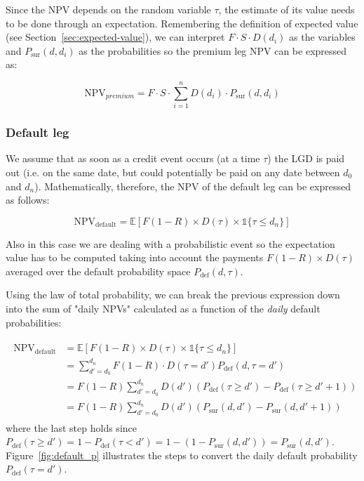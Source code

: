 Since the NPV depends on the random variable $\tau$, the estimate of its value needs to be done through an expectation.
Remembering the definition of expected value (see Section~\ref{sec:expected-value}), we can interpret 
\(F\cdot S\cdot D(d_i)\) as the variables and $P_{\textrm{sur}}(d, d_i)$ as the probabilities so the premium leg NPV can be expressed as:

\begin{equation}
	\textrm{NPV}_{premium} = F\cdot S \cdot \sum_{i=1}^{n} D(d_i) \cdot P_{\textrm{sur}}(d, d_i)
\end{equation}

\subsubsection{Default leg}\label{default-leg}

We assume that as soon as a credit event occurs (at a time $\tau$) the LGD is paid out (i.e. on the same date, but could potentially be paid on any date between \(d_0\) and \(d_n\)). Mathematically, therefore, the NPV of the default leg can be expressed as follows:

\begin{equation}
\mathrm{NPV_{default}} =\mathbb{E}[F(1-R) \times D(\tau) \times \mathbb{1} \{\tau \leq d_n\} ]
\end{equation}

Also in this case we are dealing with a probabilistic event so the expectation value has to be computed taking into account the payments $F(1-R)\times D(\tau)$ averaged over the default probability space $P_{\textrm{def}}(d, \tau)$. 

Using the law of total probability, we can break the previous expression down into the sum of "daily NPVs" calculated as a function of the \emph{daily} default probabilities:

\begin{align}
\begin{split}
\mathrm{NPV_{default}} &= \mathbb{E}[F(1-R) \times D(\tau) \times \mathbb{1}\{\tau \leq d_n\} ] \\
&= \sum_{d'=d_0}^{d_n} F(1-R) \cdot D(\tau = d') P_{\textrm{def}}(d, \tau = d') \\
&= F(1-R) \sum_{d'=d_0}^{d_n} D(d') \left(P_{\textrm{def}}(\tau \geq d') - P_{\textrm{def}}( \tau \geq d'+1) \right) \\
&= F(1-R) \sum_{d'=d_0}^{d_n} D(d') \left( P_{\textrm{sur}}(d, d') - P_{\textrm{sur}}(d, d'+1) \right)
\end{split}
\end{align}
where the last step holds since $P_{\textrm{def}}(\tau\geq d') = 1 - P_{\textrm{def}}(\tau < d') = 1 - (1-P_{\textrm{sur}}(d, d')) = P_{\textrm{sur}}(d, d')$. 
Figure~\ref{fig:default_p} illustrates the steps to convert the daily default probability $P_{\textrm{def}}(\tau=d')$.

